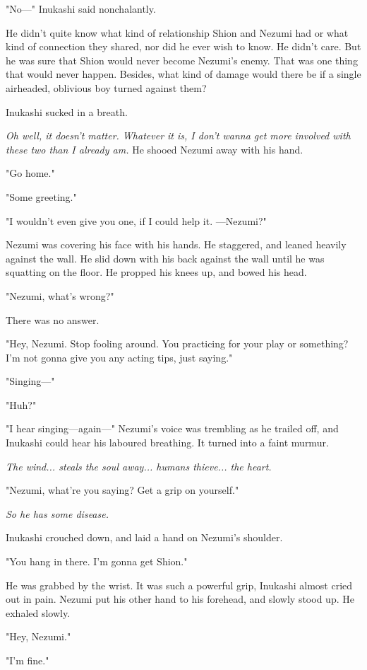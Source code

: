 "No---" Inukashi said nonchalantly.

He didn't quite know what kind of relationship Shion and Nezumi had or
what kind of connection they shared, nor did he ever wish to know. He
didn't care. But he was sure that Shion would never become Nezumi's
enemy. That was one thing that would never happen. Besides, what kind of
damage would there be if a single airheaded, oblivious boy turned
against them?

Inukashi sucked in a breath.

\emph{Oh well, it doesn't matter. Whatever it is, I don't wanna get more
involved with these two than I already am.} He shooed Nezumi away with
his hand.

"Go home."

"Some greeting."

"I wouldn't even give you one, if I could help it. ---Nezumi?"

Nezumi was covering his face with his hands. He staggered, and leaned
heavily against the wall. He slid down with his back against the wall
until he was squatting on the floor. He propped his knees up, and bowed
his head.

"Nezumi, what's wrong?"

There was no answer.

"Hey, Nezumi. Stop fooling around. You practicing for your play or
something? I'm not gonna give you any acting tips, just saying."

"Singing---"

"Huh?"

"I hear singing---again---" Nezumi's voice was trembling as he trailed off,
and Inukashi could hear his laboured breathing. It turned into a faint
murmur.

\emph{The wind... steals the soul away... humans thieve... the heart.}

"Nezumi, what're you saying? Get a grip on yourself."

\emph{So he has some disease.}

Inukashi crouched down, and laid a hand on Nezumi's shoulder.

"You hang in there. I'm gonna get Shion."

He was grabbed by the wrist. It was such a powerful grip, Inukashi
almost cried out in pain. Nezumi put his other hand to his forehead, and
slowly stood up. He exhaled slowly.

"Hey, Nezumi."

"I'm fine."


